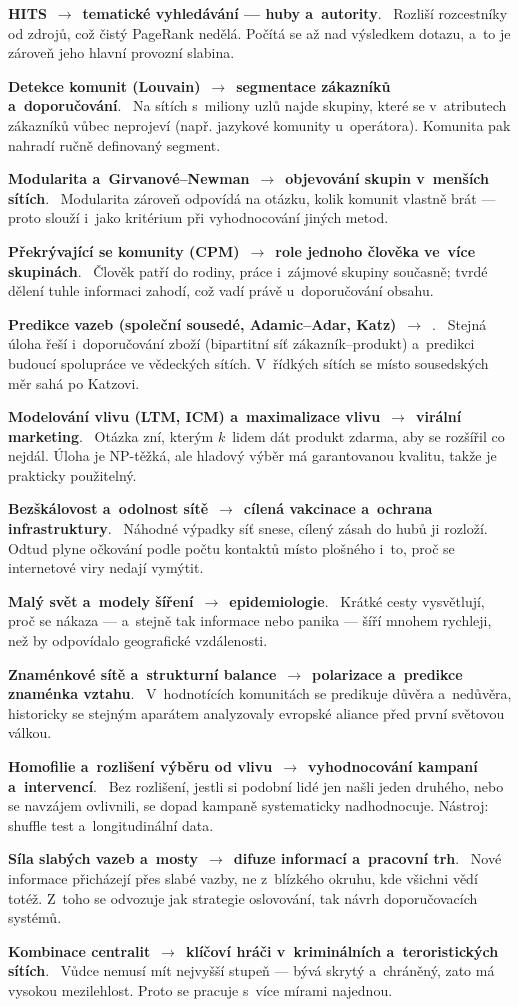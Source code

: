 \documentclass[11pt,a4paper]{article}
\newcommand{\apl}[2]{\par\addvspace{1.5mm}\noindent
  \textbf{#1}\ \textcolor{defframe}{$\rightarrow$}\ \textbf{#2}.\ \ignorespaces}
\begin{document}
\apl{HITS}{tematické vyhledávání --- huby a~autority}
Rozliší rozcestníky od zdrojů, což čistý PageRank nedělá. Počítá se až nad výsledkem
dotazu, a~to je zároveň jeho hlavní provozní slabina.

\apl{Detekce komunit (Louvain)}{segmentace zákazníků a~doporučování}
Na sítích s~miliony uzlů najde skupiny, které se v~atributech zákazníků vůbec neprojeví
(např. jazykové komunity u~operátora). Komunita pak nahradí ručně definovaný segment.

\apl{Modularita a~Girvanové--Newman}{objevování skupin v~menších sítích}
Modularita zároveň odpovídá na otázku, kolik komunit vlastně brát --- proto slouží
i~jako kritérium při vyhodnocování jiných metod.

\apl{Překrývající se komunity (CPM)}{role jednoho člověka ve~více skupinách}
Člověk patří do rodiny, práce i~zájmové skupiny současně; tvrdé dělení tuhle informaci
zahodí, což vadí právě u~doporučování obsahu.

\apl{Predikce vazeb (společní sousedé, Adamic--Adar, Katz)}{\uv{lidé, které možná znáte}}
Stejná úloha řeší i~doporučování zboží (bipartitní síť zákazník--produkt) a~predikci budoucí
spolupráce ve vědeckých sítích. V~řídkých sítích se místo sousedských měr sahá po Katzovi.

\apl{Modelování vlivu (LTM, ICM) a~maximalizace vlivu}{virální marketing}
Otázka zní, kterým $k$~lidem dát produkt zdarma, aby se rozšířil co nejdál. Úloha je
NP-těžká, ale hladový výběr má garantovanou kvalitu, takže je prakticky použitelný.

\apl{Bezškálovost a~odolnost sítě}{cílená vakcinace a~ochrana infrastruktury}
Náhodné výpadky síť snese, cílený zásah do hubů ji rozloží. Odtud plyne očkování podle počtu
kontaktů místo plošného i~to, proč se internetové viry nedají vymýtit.

\apl{Malý svět a~modely šíření}{epidemiologie}
Krátké cesty vysvětlují, proč se nákaza --- a~stejně tak informace nebo panika --- šíří
mnohem rychleji, než by odpovídalo geografické vzdálenosti.

\apl{Znaménkové sítě a~strukturní balance}{polarizace a~predikce znaménka vztahu}
V~hodnotících komunitách se predikuje důvěra a~nedůvěra, historicky se stejným aparátem
analyzovaly evropské aliance před první světovou válkou.

\apl{Homofilie a~rozlišení výběru od vlivu}{vyhodnocování kampaní a~intervencí}
Bez rozlišení, jestli si podobní lidé jen našli jeden druhého, nebo se navzájem ovlivnili,
se dopad kampaně systematicky nadhodnocuje. Nástroj: shuffle test a~longitudinální data.

\apl{Síla slabých vazeb a~mosty}{difuze informací a~pracovní trh}
Nové informace přicházejí přes slabé vazby, ne z~blízkého okruhu, kde všichni vědí totéž.
Z~toho se odvozuje jak strategie oslovování, tak návrh doporučovacích systémů.

\apl{Kombinace centralit}{klíčoví hráči v~kriminálních a~teroristických sítích}
Vůdce nemusí mít nejvyšší stupeň --- bývá skrytý a~chráněný, zato má vysokou mezilehlost.
Proto se pracuje s~více mírami najednou.
\end{document}
